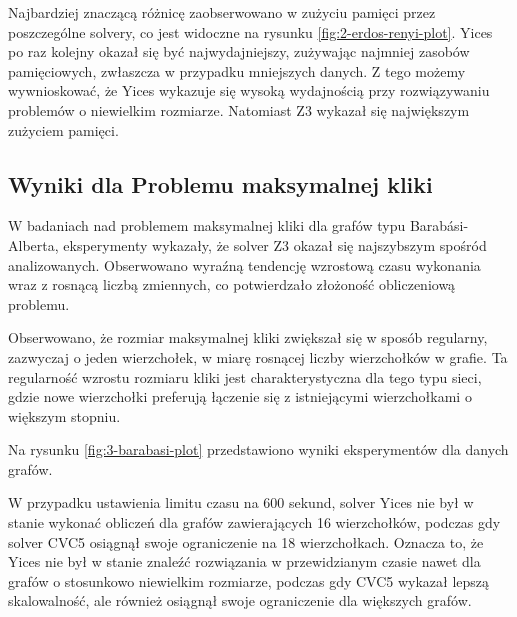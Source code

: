 
Najbardziej znaczącą różnicę zaobserwowano w zużyciu pamięci przez poszczególne solvery, co jest widoczne na rysunku \ref{fig:2-erdos-renyi-plot}. Yices po raz kolejny okazał się być najwydajniejszy, zużywając najmniej zasobów pamięciowych, zwłaszcza w przypadku mniejszych danych. Z tego możemy wywnioskować, że Yices wykazuje się wysoką wydajnością przy rozwiązywaniu problemów o niewielkim rozmiarze. Natomiast Z3 wykazał się największym zużyciem pamięci.

\subsection{Wyniki dla Problemu maksymalnej kliki}

W badaniach nad problemem maksymalnej kliki dla grafów typu Barabási-Alberta, eksperymenty wykazały, że solver Z3 okazał się najszybszym spośród analizowanych. Obserwowano wyraźną tendencję wzrostową czasu wykonania wraz z rosnącą liczbą zmiennych, co potwierdzało złożoność obliczeniową problemu.

Obserwowano, że rozmiar maksymalnej kliki zwiększał się w sposób regularny, zazwyczaj o jeden wierzchołek, w miarę rosnącej liczby wierzchołków w grafie. Ta regularność wzrostu rozmiaru kliki jest charakterystyczna dla tego typu sieci, gdzie nowe wierzchołki preferują łączenie się z istniejącymi wierzchołkami o większym stopniu.

Na rysunku \ref{fig:3-barabasi-plot} przedstawiono wyniki eksperymentów dla danych grafów.

W przypadku ustawienia limitu czasu na 600 sekund, solver Yices nie był w stanie wykonać obliczeń dla grafów zawierających 16 wierzchołków, podczas gdy solver CVC5 osiągnął swoje ograniczenie na 18 wierzchołkach. Oznacza to, że Yices nie był w stanie znaleźć rozwiązania w przewidzianym czasie nawet dla grafów o stosunkowo niewielkim rozmiarze, podczas gdy CVC5 wykazał lepszą skalowalność, ale również osiągnął swoje ograniczenie dla większych grafów.

